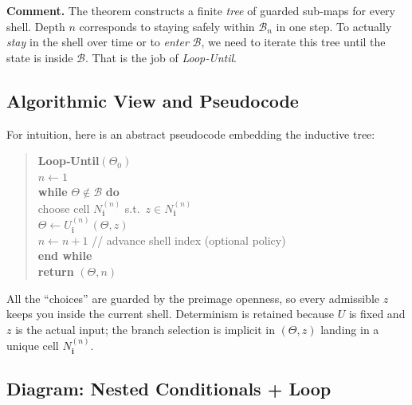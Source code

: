 \documentclass[12pt]{article}
\theoremstyle{definition}
\theoremstyle{plain}
\begin{document}
\noindent\textbf{Comment.}
The theorem constructs a finite \emph{tree} of guarded sub‑maps for every shell.  Depth $n$ corresponds to staying safely within $\mathcal B_n$ in one step.  To actually \emph{stay} in the shell over time or to \emph{enter} $\mathcal B$, we need to iterate this tree until the state is inside $\mathcal B$.  That is the job of \emph{Loop‑Until}.


\subsection{Algorithmic View and Pseudocode}
\label{subsec:pseudocode}

For intuition, here is an abstract pseudocode embedding the inductive tree:

\begin{quote}
\textbf{Loop‑Until$(\Theta_0)$}\\
$n \leftarrow 1$\\
\textbf{while} $\Theta \notin \mathcal B$ \textbf{do}\\
\quad choose cell $N^{(n)}_{\mathbf i}$ s.t.\ $z\in N^{(n)}_{\mathbf i}$\\
\quad $\Theta \leftarrow U^{(n)}_{\mathbf i}(\Theta,z)$\\
\quad $n \leftarrow n+1$ \hfill // advance shell index (optional policy)\\
\textbf{end while}\\
\textbf{return} $(\Theta, n)$
\end{quote}

All the “choices” are guarded by the preimage openness, so every admissible $z$ keeps you inside the current shell.  Determinism is retained because $U$ is fixed and $z$ is the actual input; the branch selection is implicit in $(\Theta,z)$ landing in a unique cell $N^{(n)}_{\mathbf i}$.

\subsection{Diagram: Nested Conditionals + Loop}
\label{subsec:diagram-loop}
\end{document}
